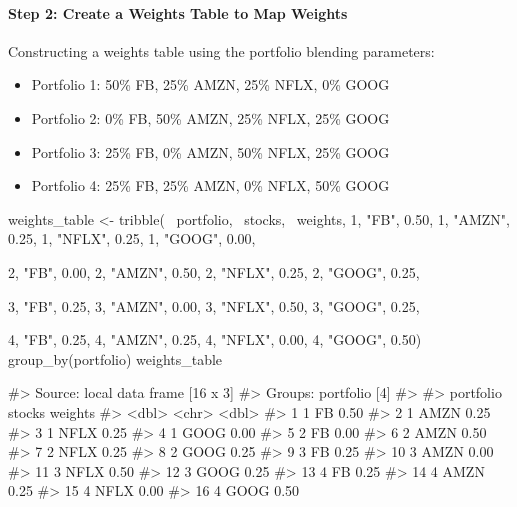 \paragraph{Step 2: Create a Weights Table to Map
Weights}\label{step-2-create-a-weights-table-to-map-weights}

Constructing a weights table using the portfolio blending parameters:

\begin{itemize}
\tightlist
\item
  Portfolio 1: 50\% FB, 25\% AMZN, 25\% NFLX, 0\% GOOG
\item
  Portfolio 2: 0\% FB, 50\% AMZN, 25\% NFLX, 25\% GOOG
\item
  Portfolio 3: 25\% FB, 0\% AMZN, 50\% NFLX, 25\% GOOG
\item
  Portfolio 4: 25\% FB, 25\% AMZN, 0\% NFLX, 50\% GOOG
\end{itemize}

\begin{Schunk}
\begin{Sinput}
weights_table <- tribble(
    ~portfolio, ~stocks, ~weights,
    1,          "FB",    0.50,
    1,          "AMZN",  0.25,
    1,          "NFLX",  0.25,
    1,          "GOOG",  0.00,

    2,          "FB",    0.00,
    2,          "AMZN",  0.50,
    2,          "NFLX",  0.25,
    2,          "GOOG",  0.25,

    3,          "FB",    0.25,
    3,          "AMZN",  0.00,
    3,          "NFLX",  0.50,
    3,          "GOOG",  0.25,

    4,          "FB",    0.25,
    4,          "AMZN",  0.25,
    4,          "NFLX",  0.00,
    4,          "GOOG",  0.50) %
    group_by(portfolio)
weights_table
\end{Sinput}
\begin{Soutput}
#> Source: local data frame [16 x 3]
#> Groups: portfolio [4]
#> 
#>    portfolio stocks weights
#>        <dbl>  <chr>   <dbl>
#> 1          1     FB    0.50
#> 2          1   AMZN    0.25
#> 3          1   NFLX    0.25
#> 4          1   GOOG    0.00
#> 5          2     FB    0.00
#> 6          2   AMZN    0.50
#> 7          2   NFLX    0.25
#> 8          2   GOOG    0.25
#> 9          3     FB    0.25
#> 10         3   AMZN    0.00
#> 11         3   NFLX    0.50
#> 12         3   GOOG    0.25
#> 13         4     FB    0.25
#> 14         4   AMZN    0.25
#> 15         4   NFLX    0.00
#> 16         4   GOOG    0.50
\end{Soutput}
\end{Schunk}

